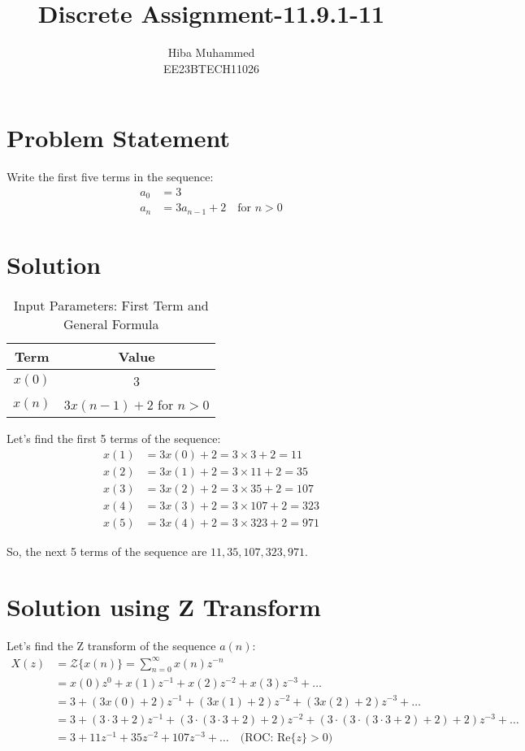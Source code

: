 \documentclass[12pt]{article}
\begin{document}
\title{Discrete Assignment-11.9.1-11}
\author{Hiba Muhammed \\
        EE23BTECH11026}
\maketitle

\section*{Problem Statement}
Write the first five terms in the sequence:
\[
\begin{aligned}
a_{0}  &= 3 \\
a_{n}  &= 3a_{n-1} + 2 \quad \text{for } n > 0
\end{aligned}
\]

\section*{Solution}
\begin{table}[h]
  \centering
  \caption{Input Parameters: First Term and General Formula}
  \begin{tabular}{|c|c|}
    \hline
    \textbf{Term} & \textbf{Value} \\
    \hline
    \(x(0) \) & 3 \\
    \(x(n)\) & \(3x(n-1) + 2\) for \(n > 0\) \\
    \hline
  \end{tabular}
\end{table}
Let's find the first 5 terms of the sequence:
\begin{align}
x(1) &= 3x(0)  + 2 = 3 \times 3 + 2 = 11 \\
x(2) &= 3x(1) + 2 = 3 \times 11 + 2 = 35 \\
x(3) &= 3x(2) + 2 = 3 \times 35 + 2 = 107 \\
x(4) &= 3x(3) + 2 = 3 \times 107 + 2 = 323 \\
x(5) &= 3x(4) + 2 = 3 \times 323 + 2 = 971 
\end{align}

So, the next 5 terms of the sequence are \(11, 35, 107, 323, 971\).


\section*{Solution using Z Transform}
Let's find the Z transform of the sequence \(a(n)\):
\begin{align*}
X(z) &= \mathcal{Z}\{x(n)\} = \sum_{n=0}^{\infty} x(n)z^{-n} \\
&= x(0)z^0 + x(1)z^{-1} + x(2)z^{-2} + x(3)z^{-3} + \ldots \\
&= 3 + (3x(0) + 2)z^{-1} + (3x(1) + 2)z^{-2} + (3x(2) + 2)z^{-3} + \ldots \\
&= 3 + (3 \cdot 3 + 2)z^{-1} + (3 \cdot (3 \cdot 3 + 2) + 2)z^{-2} + (3 \cdot (3 \cdot (3 \cdot 3 + 2) + 2) + 2)z^{-3} + \ldots \\
&= 3 + 11z^{-1} + 35z^{-2} + 107z^{-3} + \ldots \quad \text{(ROC: Re}\{z\} > 0)
\end{align*}
\end{document}
